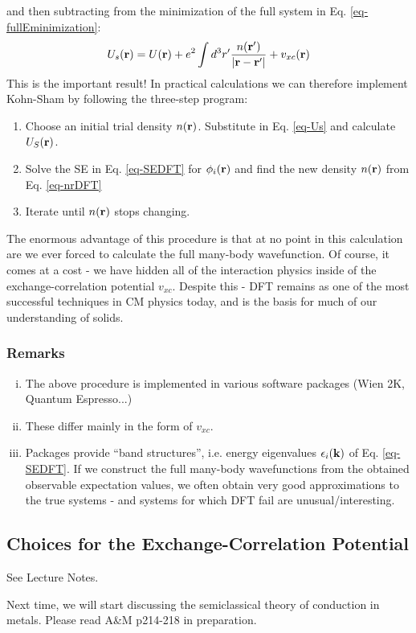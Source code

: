 and then subtracting from the minimization of the full system in Eq. \eqref{eq-fullEminimization}:
\begin{equation}\label{eq-Us}
    U_s(\mathbf{r}) = U(\mathbf{r}) + e^2\int d^3r'\frac{n(\mathbf{r}')}{\lvert \mathbf{r} - \mathbf{r}' \rvert} + v_{xc}(\mathbf{r})
\end{equation}
This is the important result! In practical calculations we can therefore implement Kohn-Sham by following the three-step program:
\begin{enumerate}
    \item Choose an initial trial density $n(\mathbf{r})$. Substitute in Eq. \eqref{eq-Us} and calculate $U_S(\mathbf{r})$. 
    \item Solve the SE in Eq. \eqref{eq-SEDFT} for $\phi_i(\mathbf{r})$ and find the new density $n(\mathbf{r})$ from Eq. \eqref{eq-nrDFT}
    \item Iterate until $n(\mathbf{r})$ stops changing.
\end{enumerate}
The enormous advantage of this procedure is that at no point in this calculation are we ever forced to calculate the full many-body wavefunction. Of course, it comes at a cost - we have hidden all of the interaction physics inside of the exchange-correlation potential $v_{xc}$. Despite this - DFT remains as one of the most successful techniques in CM physics today, and is the basis for much of our understanding of solids.

\subsubsection{Remarks}
\begin{enumerate}[(i)]
    \item The above procedure is implemented in various software packages (Wien 2K, Quantum Espresso...)
    \item These differ mainly in the form of $v_{xc}$. 
    \item Packages provide ``band structures'', i.e. energy eigenvalues $\epsilon_i(\mathbf{k})$ of Eq. \eqref{eq-SEDFT}. If we construct the full many-body wavefunctions from the obtained observable expectation values, we often obtain very good approximations to the true systems - and systems for which DFT fail are unusual/interesting.
\end{enumerate}

\subsection{Choices for the Exchange-Correlation Potential}
See Lecture Notes.

Next time, we will start discussing the semiclassical theory of conduction in metals. Please read A\&M p214-218 in preparation.